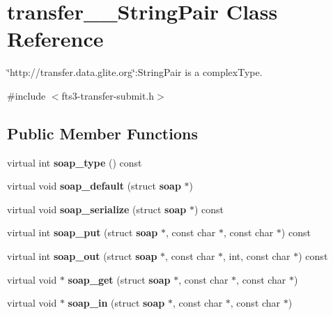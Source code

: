 \section{transfer\_\-\_\-StringPair Class Reference}
\label{classtransfer____StringPair}


\char`\"{}http://transfer.data.glite.org\char`\"{}:StringPair is a complexType.  




{\ttfamily \#include $<$fts3-\/transfer-\/submit.h$>$}

\subsection*{Public Member Functions}
\begin{DoxyCompactItemize}
\item 
virtual int {\bfseries soap\_\-type} () const \label{classtransfer____StringPair_a9cd1e400332a0a45cec0229570dc36f7}

\item 
virtual void {\bfseries soap\_\-default} (struct {\bf soap} $\ast$)\label{classtransfer____StringPair_a7d34c028f43bcb89013da38ed91d2863}

\item 
virtual void {\bfseries soap\_\-serialize} (struct {\bf soap} $\ast$) const \label{classtransfer____StringPair_a8deebc2de84a4e7b692e87580d37864e}

\item 
virtual int {\bfseries soap\_\-put} (struct {\bf soap} $\ast$, const char $\ast$, const char $\ast$) const \label{classtransfer____StringPair_ae019859f493b0fb229d35bbac12fb544}

\item 
virtual int {\bfseries soap\_\-out} (struct {\bf soap} $\ast$, const char $\ast$, int, const char $\ast$) const \label{classtransfer____StringPair_ae491675d9ba8508dc8c3faefba5fef9d}

\item 
virtual void $\ast$ {\bfseries soap\_\-get} (struct {\bf soap} $\ast$, const char $\ast$, const char $\ast$)\label{classtransfer____StringPair_a3db494369b625f9d05f739b78897d9f5}

\item 
virtual void $\ast$ {\bfseries soap\_\-in} (struct {\bf soap} $\ast$, const char $\ast$, const char $\ast$)\label{classtransfer____StringPair_a25af095ae8bad4a7d2ca38f546e21c22}

\end{DoxyCompactItemize}
